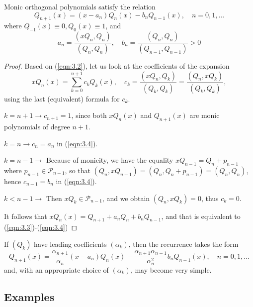 \documentclass[a4paper]{article}
\begin{document}
\begin{theorem}
    Monic orthogonal polynomials satisfy the relation
    \begin{equation}\label{eqn:3.3}
        Q_{n+1}(x)=\left(x-a_n\right) Q_n(x)-b_n Q_{n-1}(x), \quad n=0,1, \ldots
    \end{equation}
    where $Q_{-1}(x) \equiv 0, Q_0(x) \equiv 1$, and
    \begin{equation}\label{eqn:3.4}
        a_n=\frac{\left(x Q_n, Q_n\right)}{\left(Q_n, Q_n\right)}, \quad b_n=\frac{\left(Q_n, Q_n\right)}{\left(Q_{n-1}, Q_{n-1}\right)}>0
    \end{equation}
\end{theorem}
\begin{proof}
    Based on (\ref{eqn:3.2}), let us look at the coefficients of the expansion
    \[
    x Q_n(x)=\sum_{k=0}^{n+1} c_k Q_k(x), \quad c_k=\frac{\left(x Q_n, Q_k\right)}{\left(Q_k, Q_k\right)}=\frac{\left(Q_n, x Q_k\right)}{\left(Q_k, Q_k\right)},
    \]
    using the last (equivalent) formula for $c_k$.

    $k=n+1 \to  c_{n+1}=1$, since both $x Q_n(x)$ and $Q_{n+1}(x)$ are monic polynomials of degree $n+1$.

    $k=n \to  c_n=a_n$ in (\ref{eqn:3.4}).

    $k=n-1 \to $ Because of monicity, we have the equality $x Q_{n-1}=Q_n+p_{n-1}$ where $p_{n-1} \in \mathcal{P}_{n-1}$, so that $\left(Q_n, x Q_{n-1}\right)=\left(Q_n, Q_n+p_{n-1}\right)=\left(Q_n, Q_n\right)$, hence $c_{n-1}=b_n$ in (\ref{eqn:3.4}).

    $k<n-1 \to $ Then $x Q_k \in \mathcal{P}_{n-1}$, and we obtain $\left(Q_n, x Q_k\right)=0$, thus $c_k=0$.

    It follows that $x Q_n(x)=Q_{n+1}+a_n Q_n+b_n Q_{n-1}$, and that is equivalent to (\ref{eqn:3.3})-(\ref{eqn:3.4})
\end{proof}
\begin{remark}
    If $\left(Q_k\right)$ have leading coefficients $\left(\alpha_k\right)$, then the recurrence takes the form
    \[
    Q_{n+1}(x)=\frac{\alpha_{n+1}}{\alpha_n}\left(x-a_n\right) Q_n(x)-\frac{\alpha_{n+1} \alpha_{n-1}}{\alpha_n^2} b_n Q_{n-1}(x), \quad n=0,1, \ldots
    \]
    and, with an appropriate choice of $\left(\alpha_k\right)$, may become very simple.
\end{remark}

\subsection{Examples}
\ \vspace*{-1.5em}
\end{document}
